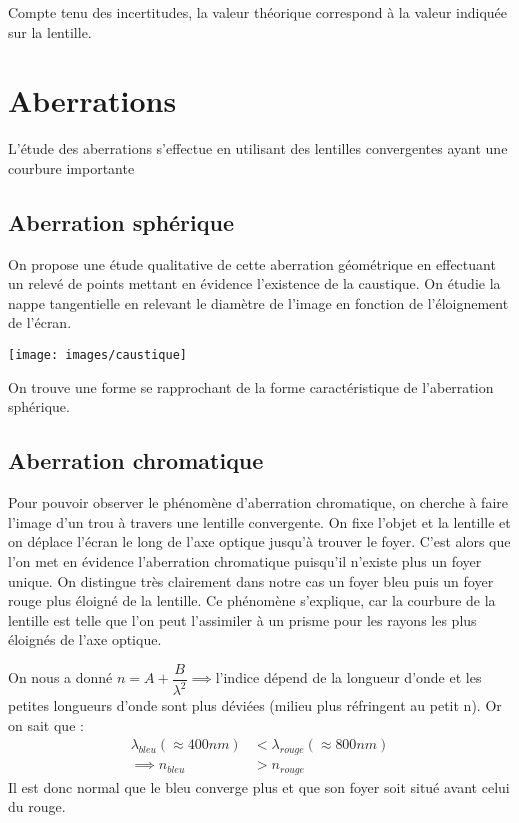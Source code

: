 \documentclass[12pt,a4paper]{article}
\begin{document}
	Compte tenu des incertitudes, la valeur théorique correspond à la valeur indiquée sur la lentille.
	\section{Aberrations}
	L'étude des aberrations s'effectue en utilisant des lentilles convergentes ayant une courbure importante
	\subsection{Aberration sphérique}
	On propose une étude qualitative de cette aberration géométrique en effectuant un relevé de points mettant en évidence l'existence de la caustique. On étudie la nappe tangentielle en relevant le diamètre de l'image en fonction de l'éloignement de l'écran.
	\begin{center}
		\texttt{[image: images/caustique]}
	\end{center}
	On trouve une forme se rapprochant de la forme caractéristique de l'aberration sphérique.
	\subsection{Aberration chromatique}
	Pour pouvoir observer le phénomène d'aberration chromatique, on cherche à faire l'image d'un trou à travers une lentille convergente. On fixe l'objet et la lentille et on déplace l'écran le long de l'axe optique jusqu'à trouver le foyer. C'est alors que l'on met en évidence l'aberration chromatique puisqu'il n'existe plus un foyer unique. On distingue très clairement dans notre cas un foyer bleu puis un foyer rouge plus éloigné de la lentille. Ce phénomène s'explique, car la courbure de la lentille est telle que l'on peut l'assimiler à un prisme pour les rayons les plus éloignés de l'axe optique.
	
	On nous a donné $n=A+\dfrac{B}{\lambda^2}\implies$l'indice dépend de la longueur d'onde et les petites longueurs d'onde sont plus déviées (milieu plus réfringent au petit n). Or on sait que :
	\begin{align*}
	\lambda_{bleu}(\approx400nm)&<\lambda_{rouge}(\approx800nm)\\
	\implies n_{bleu}&>n_{rouge}
	\end{align*}
	Il est donc normal que le bleu converge plus et que son foyer soit situé avant celui du rouge.
\end{document}
